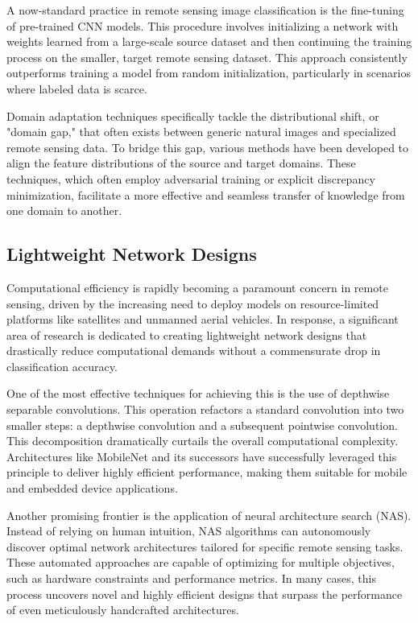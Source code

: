 \documentclass[12pt,a4paper]{article}
\begin{document}
A now-standard practice in remote sensing image classification is the fine-tuning of pre-trained CNN models. This procedure involves initializing a network with weights learned from a large-scale source dataset and then continuing the training process on the smaller, target remote sensing dataset. This approach consistently outperforms training a model from random initialization, particularly in scenarios where labeled data is scarce.

Domain adaptation techniques specifically tackle the distributional shift, or "domain gap," that often exists between generic natural images and specialized remote sensing data. To bridge this gap, various methods have been developed to align the feature distributions of the source and target domains. These techniques, which often employ adversarial training or explicit discrepancy minimization, facilitate a more effective and seamless transfer of knowledge from one domain to another.

\subsection{Lightweight Network Designs}
Computational efficiency is rapidly becoming a paramount concern in remote sensing, driven by the increasing need to deploy models on resource-limited platforms like satellites and unmanned aerial vehicles. In response, a significant area of research is dedicated to creating lightweight network designs that drastically reduce computational demands without a commensurate drop in classification accuracy.

One of the most effective techniques for achieving this is the use of depthwise separable convolutions. This operation refactors a standard convolution into two smaller steps: a depthwise convolution and a subsequent pointwise convolution. This decomposition dramatically curtails the overall computational complexity. Architectures like MobileNet and its successors have successfully leveraged this principle to deliver highly efficient performance, making them suitable for mobile and embedded device applications.

Another promising frontier is the application of neural architecture search (NAS). Instead of relying on human intuition, NAS algorithms can autonomously discover optimal network architectures tailored for specific remote sensing tasks. These automated approaches are capable of optimizing for multiple objectives, such as hardware constraints and performance metrics. In many cases, this process uncovers novel and highly efficient designs that surpass the performance of even meticulously handcrafted architectures.
\end{document}
